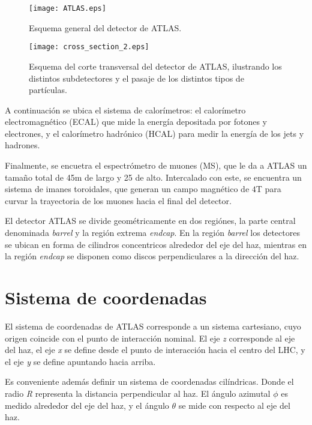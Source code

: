 \begin{figure}
\centering
\texttt{[image: ATLAS.eps]}
\caption{Esquema general del detector de ATLAS.}
\label{ATLAS}
\end{figure}

\begin{figure}
\centering
\texttt{[image: cross\_section\_2.eps]}
\caption{Esquema del corte transversal del detector de ATLAS, ilustrando los distintos subdetectores y el pasaje de los distintos tipos de partículas.}
\label{cross_section_2}
\end{figure}

A continuación se ubica el sistema de calorímetros: el calorímetro electromagnético (ECAL) que mide la energía depositada por fotones y electrones, y el calorímetro hadrónico (HCAL) para medir la energía de los jets y hadrones.

Finalmente, se encuetra el espectrómetro de muones (MS), que le da a ATLAS un tamaño total de 45m de largo y 25 de alto. Intercalado con este, se encuentra un sistema de imanes toroidales, que generan un campo magnético de $4$T para curvar la trayectoria de los muones hacia el final del detector.

El detector ATLAS se divide geométricamente en dos regiónes, la parte central denominada \textit{barrel} y la región extrema \textit{endcap}. En la región \textit{barrel} los detectores se ubican en forma de cilindros concentricos alrededor del eje del haz, mientras en la región \textit{endcap} se disponen como discos perpendiculares a la dirección del haz. 

\section{Sistema de coordenadas}

El sistema de coordenadas de ATLAS corresponde a un sistema cartesiano, cuyo origen coincide con el punto de interacción nominal. El eje \textit{z} corresponde al eje del haz, el eje \textit{x} se define desde el punto de interacción hacia el centro del LHC, y el eje \textit{y} se define apuntando hacia arriba.

Es conveniente además definir un sistema de coordenadas cilíndricas. Donde el radio \textit{R} representa la distancia perpendicular al haz. El ángulo azimutal $\phi$ es medido alrededor del eje del haz, y el ángulo $\theta$ se mide con respecto al eje del haz. 

